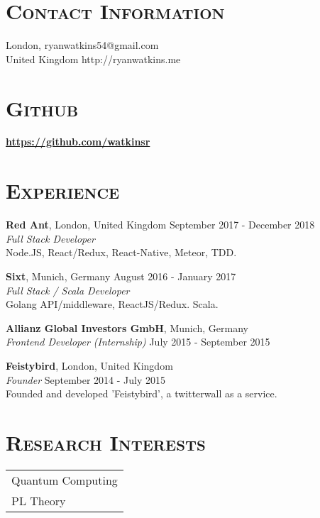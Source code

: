 \documentclass[line, margin, 10pt]{res}
\begin{document}
\renewcommand{\namefont}{ \LARGE \bf }


\begin{resume}

\section{\textsc{Contact Information}}
London,  \hfill {ryanwatkins54@gmail.com}\\
United Kingdom \hfill {http://ryanwatkins.me}\\

\section{\textsc{Github}}
{\bf \url{https://github.com/watkinsr}}\\

\section{\textsc{Experience}}

{\bf Red Ant}, London, United Kingdom {\hfill September 2017 -  December 2018}\\
{\it Full Stack Developer} \\
Node.JS, React/Redux, React-Native, Meteor, TDD.

{\bf Sixt}, Munich, Germany {\hfill August 2016 - January 2017}\\
{\it Full Stack / Scala Developer} \\
Golang API/middleware, ReactJS/Redux. Scala.

{\bf Allianz Global Investors GmbH}, Munich, Germany\\
{\it Frontend Developer (Internship)} {\hfill July 2015 - September 2015}

{\bf Feistybird}, London, United Kingdom \\
\textit{Founder} \hfill {September 2014 - July 2015}\\
Founded and developed 'Feistybird', a twitterwall as a service.

\section{\textsc{Research Interests}}
\begin{tabular}[t]{@{} p{6.0 in}  @{}}
  Quantum Computing\\
  PL Theory\\
\end{tabular}


\end{resume}
\end{document}
